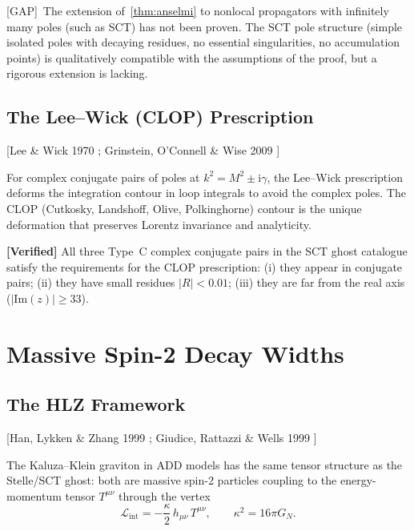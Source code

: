 \documentclass[11pt,a4paper]{article}
\theoremstyle{plain}
\theoremstyle{definition}
\theoremstyle{remark}
\newcommand{\ii}{\mathrm{i}}
\newcommand{\fromlit}[1]{\textcolor{blue!70!black}{\textsf{[#1]}}}
\newcommand{\gap}{\textcolor{red!80!black}{\textsf{[GAP]}}}
\newcommand{\verified}[1]{%
  \par\smallskip\noindent
  \colorbox{green!10}{\parbox{\dimexpr\linewidth-2\fboxsep}{%
    \textcolor{green!50!black}{\textbf{[Verified]}} #1}}%
  \par\smallskip}
\begin{document}
\gap\ The extension of~\cref{thm:anselmi} to nonlocal propagators with
infinitely many poles (such as SCT) has not been proven.  The SCT pole
structure (simple isolated poles with decaying residues, no essential
singularities, no accumulation points) is qualitatively compatible with
the assumptions of the proof, but a rigorous extension is lacking.

\subsection{The Lee--Wick (CLOP) Prescription}

\fromlit{Lee \& Wick 1970 \cite{LeeWick1970};
Grinstein, O'Connell \& Wise 2009 \cite{CLOP2009}}

For complex conjugate pairs of poles at $k^2 = M^2 \pm \ii\gamma$, the
Lee--Wick prescription deforms the integration contour in loop integrals
to avoid the complex poles.  The CLOP (Cutkosky, Landshoff, Olive, Polkinghorne)
contour is the unique deformation that preserves Lorentz invariance and
analyticity.

\verified{All three Type~C complex conjugate pairs in the SCT ghost
catalogue satisfy the requirements for the CLOP prescription:
(i) they appear in conjugate pairs; (ii) they have small residues
$|R| < 0.01$; (iii) they are far from the real axis ($|\mathrm{Im}(z)|
\geq 33$).}


\section{Massive Spin-2 Decay Widths}
\label{sec:HLZ}

\subsection{The HLZ Framework}

\fromlit{Han, Lykken \& Zhang 1999 \cite{HLZ1999};
Giudice, Rattazzi \& Wells 1999 \cite{GRW1999}}

The Kaluza--Klein graviton in ADD models has the same tensor structure
as the Stelle/SCT ghost: both are massive spin-2 particles coupling to
the energy-momentum tensor $T^{\mu\nu}$ through the vertex
\begin{equation}\label{eq:vertex}
  \mathcal{L}_{\mathrm{int}}
  = -\frac{\kappa}{2}\,h_{\mu\nu}\,T^{\mu\nu},
  \qquad \kappa^2 = 16\pi G_N.
\end{equation}
\end{document}
